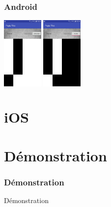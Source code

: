 \documentclass{beamer}
\begin{document}
\begin{frame}
\frametitle<1->{Android}


    \begin{center}
      \includegraphics[width=20mm]{AndroidGame}
      \includegraphics[width=20mm]{AndroidGameInvers}

    \end{center}
   
\end{frame}




\section{iOS}



\section{Démonstration}

\begin{frame}
\frametitle{Démonstration}
	\Huge{\centerline{Démonstration}}
\end{frame}
\end{document}
